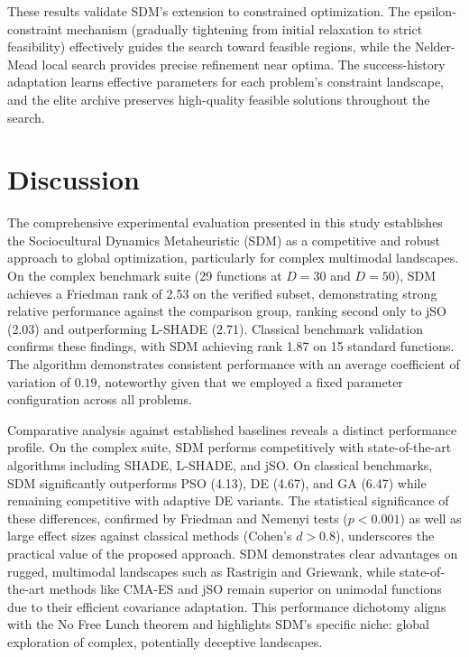 \documentclass[11pt]{article}
\begin{document}
These results validate SDM's extension to constrained optimization. The epsilon-constraint mechanism (gradually tightening from initial relaxation to strict feasibility) effectively guides the search toward feasible regions, while the Nelder-Mead local search provides precise refinement near optima. The success-history adaptation learns effective parameters for each problem's constraint landscape, and the elite archive preserves high-quality feasible solutions throughout the search.

\section{Discussion}

\label{sec:discussion}

The comprehensive experimental evaluation presented in this study establishes the Sociocultural Dynamics Metaheuristic (SDM) as a competitive and robust approach to global optimization, particularly for complex multimodal landscapes. On the complex benchmark suite (29 functions at $D=30$ and $D=50$), SDM achieves a Friedman rank of 2.53 on the verified subset, demonstrating strong relative performance against the comparison group, ranking second only to jSO (2.03) and outperforming L-SHADE (2.71). Classical benchmark validation confirms these findings, with SDM achieving rank 1.87 on 15 standard functions. The algorithm demonstrates consistent performance with an average coefficient of variation of $0.19$, noteworthy given that we employed a fixed parameter configuration across all problems.

Comparative analysis against established baselines reveals a distinct performance profile. On the complex suite, SDM performs competitively with state-of-the-art algorithms including SHADE, L-SHADE, and jSO. On classical benchmarks, SDM significantly outperforms PSO (4.13), DE (4.67), and GA (6.47) while remaining competitive with adaptive DE variants. The statistical significance of these differences, confirmed by Friedman and Nemenyi tests ($p < 0.001$) as well as large effect sizes against classical methods (Cohen's $d > 0.8$), underscores the practical value of the proposed approach. SDM demonstrates clear advantages on rugged, multimodal landscapes such as Rastrigin and Griewank, while state-of-the-art methods like CMA-ES and jSO remain superior on unimodal functions due to their efficient covariance adaptation. This performance dichotomy aligns with the No Free Lunch theorem and highlights SDM's specific niche: global exploration of complex, potentially deceptive landscapes.
\end{document}
